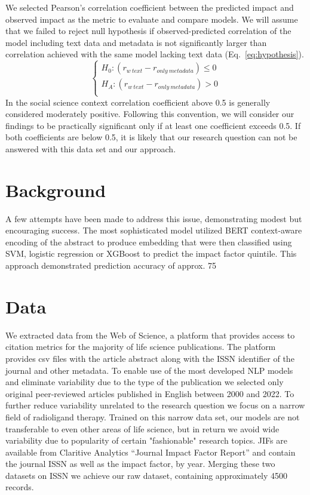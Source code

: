 \documentclass[11pt]{article}
\begin{document}
We selected Pearson's correlation coefficient between the predicted impact and observed impact as the metric to evaluate and compare models. We will assume that we failed to reject null hypothesis if observed-predicted correlation of the model including text data and metadata is not significantly larger than correlation achieved with the same model lacking text data (Eq.~\ref{eq:hypothesis}).
\begin{equation}\label{eq:hypothesis}
	\begin{cases}
		H_{0}: (r_{w\ text} - r_{only\ metadata}) \leq 0 \\
		H_{A}: (r_{w\ text} - r_{only\ metadata}) > 0\\
	\end{cases}       
\end{equation}
In the social science context correlation coefficient above 0.5 is generally considered moderately positive\citep{KahnemanDaniel2021N:af}. Following this convention, we will consider our findings to be practically significant only if at least one coefficient exceeds 0.5. If both coefficients are below 0.5, it is likely that our research question can not be answered with this data set and our approach. 

\section{Background}
A few attempts have been made to address this issue, demonstrating modest but encouraging success. \citep{Macri2023-tr, Alohali2022-no, 10.1162/qss_a_00258, doi:10.1152/japplphysiol.00489.2020} The most sophisticated model utilized BERT context-aware encoding of the abstract to produce embedding that were then classified using  SVM, logistic regression or XGBoost to predict the impact factor quintile. This approach demonstrated prediction accuracy of approx. 75%

\section{Data}
We extracted data from the Web of Science, a platform that provides access to citation metrics for the majority of life science publications. The platform provides csv files with the article abstract along with the ISSN identifier of the journal and other metadata. To enable use of the most developed NLP models and eliminate variability due to the type of the publication we selected only original peer-reviewed articles published in English between 2000 and 2022. To further reduce variability unrelated to the research question we focus on a narrow field of radioligand therapy. Trained on this narrow data set, our models are not transferable to even other areas of life science, but in return we avoid wide variability due to popularity of certain "fashionable" research topics.  JIFs are available from Claritive Analytics “Journal Impact Factor Report” and contain the journal ISSN as well as the impact factor, by year. Merging these two datasets on ISSN we achieve our raw dataset, containing approximately 4500 records.
\end{document}
